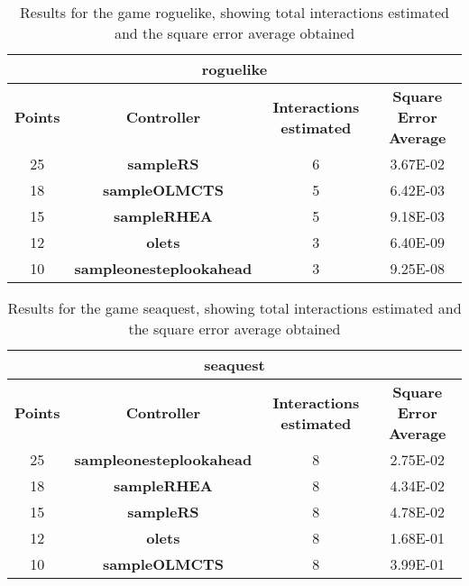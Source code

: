 \begin{table*}[!t]
\begin{center}
\begin{adjustbox}{width=1\textwidth}
\begin{tabular}{|c|c|c|c|}
\hline
\multicolumn{4}{|c|}{\textbf{roguelike}}\\
\hline
\textbf{Points} & \textbf{Controller} & \textbf{Interactions estimated} & \textbf{Square Error Average}\\
\hline
25 & \textbf{sampleRS} & 6 & 3.67E-02
 \\
\hline
18 & \textbf{sampleOLMCTS} & 5 & 6.42E-03
 \\
\hline
15 & \textbf{sampleRHEA} & 5 & 9.18E-03
 \\
\hline
12 & \textbf{olets} & 3 & 6.40E-09
 \\
\hline
10 & \textbf{sampleonesteplookahead} & 3 & 9.25E-08
 \\
\hline
\end{tabular}
\end{adjustbox}
\caption{Results for the game roguelike, showing total interactions estimated and the square error average obtained}
\label{tab:weights}
\end{center}
\end{table*}
\begin{table*}[!t]
\begin{center}
\begin{adjustbox}{width=1\textwidth}
\begin{tabular}{|c|c|c|c|}
\hline
\multicolumn{4}{|c|}{\textbf{seaquest}}\\
\hline
\textbf{Points} & \textbf{Controller} & \textbf{Interactions estimated} & \textbf{Square Error Average}\\
\hline
25 & \textbf{sampleonesteplookahead} & 8 & 2.75E-02
 \\
\hline
18 & \textbf{sampleRHEA} & 8 & 4.34E-02
 \\
\hline
15 & \textbf{sampleRS} & 8 & 4.78E-02
 \\
\hline
12 & \textbf{olets} & 8 & 1.68E-01
 \\
\hline
10 & \textbf{sampleOLMCTS} & 8 & 3.99E-01
 \\
\hline
\end{tabular}
\end{adjustbox}
\caption{Results for the game seaquest, showing total interactions estimated and the square error average obtained}
\label{tab:weights}
\end{center}
\end{table*}
